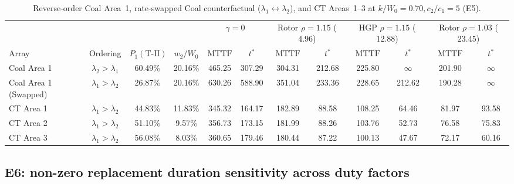 \documentclass{elektr}
\begin{document}
\begin{table}[htbp]
\centering
\scriptsize
\renewcommand{\arraystretch}{0.80}
\setlength{\tabcolsep}{2.2pt}
\caption{Reverse-order Coal Area~1, rate-swapped Coal counterfactual ($\lambda_1 \leftrightarrow \lambda_2$), and CT Areas~1--3 at $k/W_0 = 0.70, c_2/c_1 = 5$ (E5).}
\label{tab:case_e5}
\begin{tabular*}{\textwidth}{@{\extracolsep{\fill}}lccc|cc|cc|cc|cc@{}}
\toprule
 & & & & \multicolumn{2}{c|}{$\gamma = 0$} & \multicolumn{2}{c|}{Rotor $\rho=1.15$ ($4.96$)} & \multicolumn{2}{c|}{HGP $\rho=1.15$ ($12.88$)} & \multicolumn{2}{c}{Rotor $\rho=1.03$ ($23.45$)} \\
Array & Ordering & $P_1(\text{T-II})$ & $w_2/W_0$ & $\mathrm{MTTF}$ & $t^*$ & $\mathrm{MTTF}$ & $t^*$ & $\mathrm{MTTF}$ & $t^*$ & $\mathrm{MTTF}$ & $t^*$ \\
\midrule
Coal Area 1           & $\lambda_2 > \lambda_1$ & 60.49\% & 20.16\% & 465.25 & 307.29 & 304.31 & 212.68 & 225.80 & $\infty$ & 201.90 & $\infty$ \\
Coal Area 1 (Swapped) & $\lambda_1 > \lambda_2$ & 26.87\% & 20.16\% & 630.26 & 588.90 & 351.04 & 233.36 & 228.65 & 212.62   & 190.28 & $\infty$ \\
CT Area 1             & $\lambda_1 > \lambda_2$ & 44.83\% & 11.83\% & 345.32 & 164.17 & 182.89 & 88.58  & 108.25 & 64.46    & 81.97  & 93.58    \\
CT Area 2             & $\lambda_1 > \lambda_2$ & 51.10\% & 9.57\%  & 356.73 & 173.15 & 181.99 & 88.26  & 103.76 & 52.73    & 76.58  & 75.83    \\
CT Area 3             & $\lambda_1 > \lambda_2$ & 56.08\% & 8.03\%  & 360.65 & 179.46 & 180.44 & 87.22  & 100.13 & 47.67    & 72.17  & 60.16    \\
\bottomrule
\end{tabular*}
\end{table}

\subsection{E6: non-zero replacement duration sensitivity across duty factors}
\label{sec:e6}
\end{document}
